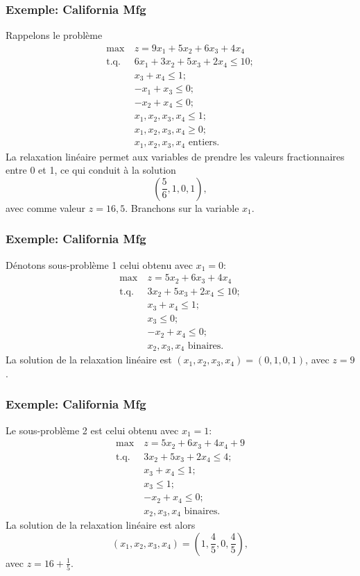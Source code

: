 \documentclass[usepdftitle=false]{beamer}
\def\st{\mbox{t.q. }}
\begin{document}
\begin{frame}
\frametitle{Exemple: California Mfg}

Rappelons le problème
\begin{align*}
\max\ & z = 9x_1 + 5x_2 + 6x_3 + 4x_4 \\
\st & 6x_1 + 3x_2 + 5x_3 + 2x_4 \leq 10; \\
& x_3 + x_4 \leq 1; \\
& -x_1 + x_3 \leq 0; \\
& -x_2 + x_4 \leq 0; \\
& x_1, x_2, x_3, x_4 \leq 1; \\
& x_1, x_2, x_3, x_4 \geq 0; \\
& x_1, x_2, x_3, x_4 \mbox{ entiers}.
\end{align*}
La relaxation linéaire permet aux variables de prendre les valeurs fractionnaires entre 0 et 1, ce qui conduit à la solution
\[
\left( \frac{5}{6}, 1, 0, 1 \right),
\]
avec comme valeur $z = 16,5$.
Branchons sur la variable $x_1$.

\end{frame}

\begin{frame}
\frametitle{Exemple: California Mfg}

Dénotons sous-problème 1 celui obtenu avec $x_1 = 0$:
\begin{align*}
\max\ & z = 5x_2 + 6x_3 + 4x_4 \\
\st & 3x_2 + 5x_3 + 2x_4 \leq 10; \\
& x_3 + x_4 \leq 1; \\
& x_3 \leq 0; \\
& -x_2 + x_4 \leq 0; \\
& x_2, x_3, x_4 \mbox{ binaires}.
\end{align*}
La solution de la relaxation linéaire est $(x_1, x_2, x_3, x_4) = (0,1,0,1)$, avec $z = 9$.

\end{frame}

\begin{frame}
\frametitle{Exemple: California Mfg}

Le sous-problème 2 est celui obtenu avec $x_1 = 1$:
\begin{align*}
\max\ & z = 5x_2 + 6x_3 + 4x_4 + 9 \\
\st & 3x_2 + 5x_3 + 2x_4 \leq 4; \\
& x_3 + x_4 \leq 1; \\
& x_3 \leq 1; \\
& -x_2 + x_4 \leq 0; \\
& x_2, x_3, x_4 \mbox{ binaires}.
\end{align*}
La solution de la relaxation linéaire est alors
\[
(x_1, x_2, x_3, x_4) = \left( 1, \frac{4}{5},0, \frac{4}{5} \right),
\]
avec $z = 16+\frac{1}{5}$.

\end{frame}
\end{document}

